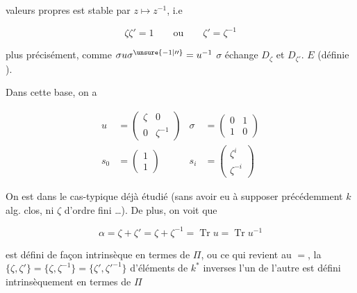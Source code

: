 
valeurs propres est stable par $z\mapsto z^{-1}$, i.e 

\[\zeta\zeta'=1\qquad\text{ou}\qquad\zeta'=\zeta^{-1}\]

plus précisément, comme $\sigma u\sigma^{\unsure{-1|\prime\prime}}=u^{-1}$ $\sigma$ échange $D_\zeta$ et $D_{\zeta'}$.    $E$ (définie  ).

Dans cette base, on a

\[\begin{aligned}
u&=\begin{pmatrix}\zeta&0\\0&\zeta^{-1}\end{pmatrix}&\sigma&=\begin{pmatrix}0&1\\1&0\end{pmatrix}\\
s_0&=\begin{pmatrix}1\\1\end{pmatrix}&s_i&=\begin{pmatrix}\zeta^i\\\zeta^{-i}\end{pmatrix}
\end{aligned}\]

On est dans le cas-typique déjà étudié (sans avoir eu à supposer précédemment $k$ alg. clos, ni $\zeta$ d'ordre fini \dots). De plus, on voit que


\[\alpha=\zeta+\zeta'=\zeta+\zeta^{-1}=\operatorname{Tr}u=\operatorname{Tr}u^{-1}\]

est défini de façon intrinsèque en termes de $\Pi$, ou ce qui revient au $=$, la   $\{\zeta,\zeta'\}=\{\zeta,\zeta^{-1}\}=\{\zeta',{\zeta'}^{-1}\}$ d'éléments de $k^*$ inverses l'un de l'autre est défini intrinsèquement en termes de $\Pi$

